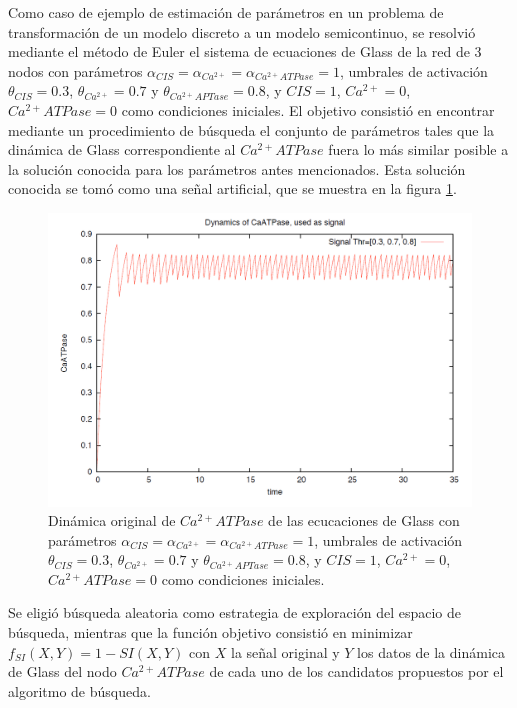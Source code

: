 Como caso de ejemplo de estimación de parámetros en un problema de transformación de un modelo discreto a un modelo semicontinuo, se resolvió mediante el método de Euler el sistema de ecuaciones de Glass de la red de 3 nodos con parámetros $\alpha_{CIS} = \alpha_{Ca^{2+}} =  \alpha_{Ca^{2+}ATPase} = 1$, umbrales de activación $\theta_{CIS} = 0.3$, $\theta_{Ca^{2+}} = 0.7$ y $\theta_{Ca^{2+}APTase} = 0.8$, y $CIS = 1$, $Ca^{2+} = 0$, $Ca^{2+}ATPase = 0$ como condiciones iniciales. El objetivo consistió en encontrar mediante un procedimiento de búsqueda el conjunto de parámetros tales que la dinámica de Glass correspondiente al $Ca^{2+}ATPase$ fuera lo más similar posible a la solución conocida para los parámetros antes mencionados. Esta solución conocida se tomó como una señal artificial, que se muestra en la figura \ref{fig:signal3nodos}.

\begin{figure}[hbt]
\includegraphics[width=0.9\linewidth]{gfx/original3Nodos}
\caption[Dinámica original $Ca^{2+}ATPase$]{Dinámica original de $Ca^{2+}ATPase$ de las ecucaciones de Glass con parámetros $\alpha_{CIS} = \alpha_{Ca^{2+}} =  \alpha_{Ca^{2+}ATPase} = 1$, umbrales de activación $\theta_{CIS} = 0.3$, $\theta_{Ca^{2+}} = 0.7$ y $\theta_{Ca^{2+}APTase} = 0.8$, y $CIS = 1$, $Ca^{2+} = 0$, $Ca^{2+}ATPase = 0$ como condiciones iniciales.}\label{fig:signal3nodos}
\end{figure}

Se eligió búsqueda aleatoria como estrategia de exploración del espacio de búsqueda, mientras que la función objetivo consistió en minimizar $f_{SI}(X,Y) = 1 -SI(X,Y)$ con $X$ la señal original y $Y$ los datos de la dinámica de Glass del nodo $Ca^{2+}ATPase$ de cada uno de los candidatos propuestos por el algoritmo de búsqueda.

